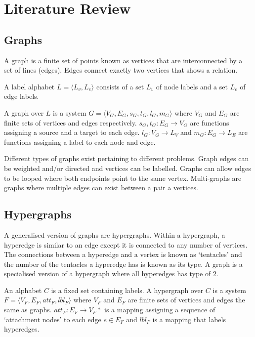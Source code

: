 \section{Literature Review}

\subsection{Graphs}
  

  A graph is a finite set of points known as vertices that are interconnected by a set of lines (edges). Edges connect exactly two vertices that shows a relation.

  A label alphabet $L = \langle L_v, L_e \rangle$ consists of a set $L_v$ of node labels and a set $L_e$ of edge labels.

  A graph over $L$ is a system $G = \langle V_G, E_G, s_G, t_G, l_G, m_G \rangle$ where $V_G$ and $E_G$ are finite sets of vertices and edges respectively. $s_G, t_G : E_G \to V_G$ are functions assigning a source and a target to each edge. $l_G : V_G \to L_V$ and $m_G : E_G \to L_E$ are functions assigning a label to each node and edge\cite{Detlef1}.

  Different types of graphs exist pertaining to different problems. Graph edges can be weighted and/or directed and vertices can be labelled. Graphs can allow edges to be looped where both endpoints point to the same vertex. Multi-graphs are graphs where multiple edges can exist between a pair a vertices.

\subsection{Hypergraphs}
  

  A generalised version of graphs are hypergraphs. Within a hypergraph, a hyperedge is similar to an edge except it is connected to any number of vertices. The connections between a hyperedge and a vertex is known as `tentacles' and the number of the tentacles a hyperedge has is known as its type. A graph is a specialised version of a hypergraph where all hyperedges has type of $2$.

  An alphabet $C$ is a fixed set containing labels. A hypergraph over $C$ is a system $F = \langle V_F, E_F, att_F, lbl_F \rangle$ where $V_F$ and $E_F$ are finite sets of vertices and edges the same as graphs. $att_F : E_F \to V_F*$ is a mapping assigning a sequence of `attachment nodes' to each edge $e \in E_F$ and $lbl_F$ is a mapping that labels hyperedges. 

